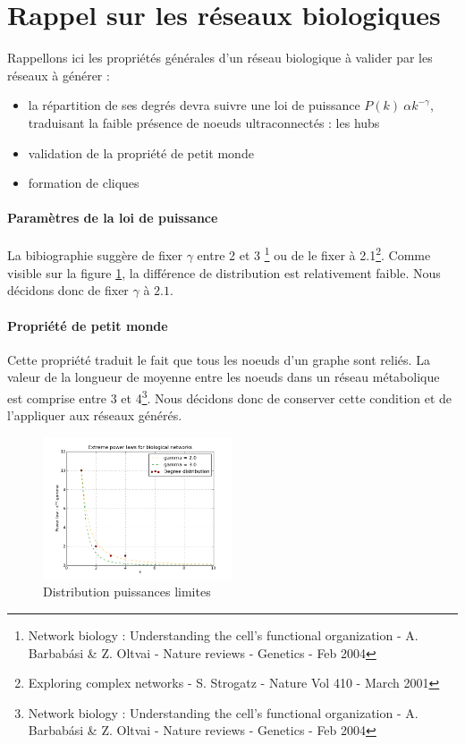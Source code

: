 \section{Rappel sur les réseaux biologiques}

Rappellons ici les propriétés générales d'un réseau biologique à valider par les réseaux à générer :
\begin{itemize}
	\item la répartition de ses degrés devra suivre une loi de puissance $ P(k) ~ \alpha k^{-\gamma} $, traduisant la faible présence de noeuds ultraconnectés : les hubs
	\item validation de la propriété de \og petit monde\fg
	\item formation de cliques 
\end{itemize}

\paragraph*{Paramètres de la loi de puissance\\}
La bibiographie suggère de fixer $\gamma $ entre 2 et 3 \footnote{Network biology : Understanding the cell's functional organization - A. Barbab\'{a}si \& Z. Oltvai - Nature reviews - Genetics - Feb 2004} ou de le fixer à 2.1\footnote{Exploring complex networks - S. Strogatz - Nature Vol 410 - March 2001}. Comme visible sur la figure \ref{scalefree}, la différence de distribution est relativement faible. Nous décidons donc de fixer $\gamma$ à $2.1$.


\paragraph*{Propriété de petit monde \\}
Cette propriété traduit le fait que tous les noeuds d'un graphe sont reliés. La valeur de la longueur de moyenne entre les noeuds dans un réseau métabolique est comprise entre 3 et 4\footnote{Network biology : Understanding the cell's functional organization - A. Barbab\'{a}si \& Z. Oltvai - Nature reviews - Genetics - Feb 2004}. Nous décidons donc de conserver cette condition et de l'appliquer aux réseaux générés.

\begin{figure}
  \begin{center}
    \includegraphics[width=0.50\textwidth]{plot.png}
  \end{center}
  \caption{Distribution puissances limites}
  \label{scalefree}
\end{figure}
